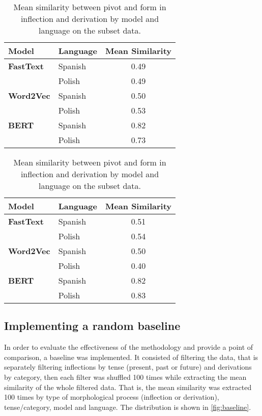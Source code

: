 \documentclass[12pt]{article}
\begin{document}
\begin{table}[htbp]
\centering
\label{tbl:subset-results}
\begin{minipage}[t]{0.48\textwidth}
\small
\centering
{}
\begin{tabular}{llc}
\toprule
\textbf{Model} & \textbf{Language} & \textbf{Mean Similarity} \\
\midrule
\textbf{FastText}  & Spanish & 0.49 \\
                   & Polish  & 0.49 \\
\textbf{Word2Vec}  & Spanish & 0.50 \\
                   & Polish  & 0.53 \\
\textbf{BERT}      & Spanish & 0.82 \\
                   & Polish  & 0.73 \\
\bottomrule
\end{tabular}
\end{minipage}
\hfill
\begin{minipage}[t]{0.48\textwidth}
\small
\centering
{}
\begin{tabular}{llc}
\toprule
\textbf{Model} & \textbf{Language} & \textbf{Mean Similarity} \\
\midrule
\textbf{FastText}  & Spanish & 0.51 \\
                   & Polish  & 0.54 \\
\textbf{Word2Vec}  & Spanish & 0.50 \\
                   & Polish  & 0.40 \\
\textbf{BERT}      & Spanish & 0.82 \\
                   & Polish  & 0.83 \\
\bottomrule
\end{tabular}
\end{minipage}
\caption{Mean similarity between pivot and form in inflection and derivation by model and language on the subset data.}
\end{table}


\subsection{Implementing a random baseline}
In order to evaluate the effectiveness of the methodology and provide a point of comparison, a baseline was implemented. It consisted of filtering the data, that is separately filtering inflections by tense (present, past or future) and derivations by category, then each filter was shuffled 100 times while extracting the mean similarity of the whole filtered data. That is, the mean similarity was extracted 100 times by type of morphological process (inflection or derivation), tense/category, model and language. The distribution is shown in \autoref{fig:baseline}.
\end{document}

